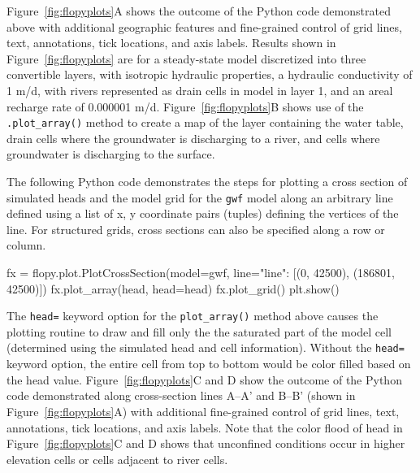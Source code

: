 \documentclass[12pt, oneside]{article}  	%
\begin{document}
\noindent Figure~\ref{fig:flopyplots}A shows the outcome of the Python code demonstrated above with additional geographic features and fine-grained control of grid lines, text, annotations, tick locations, and axis labels. Results shown in Figure~\ref{fig:flopyplots} are for a steady-state model discretized into three convertible layers, with isotropic hydraulic properties, a hydraulic conductivity of 1 m/d, with rivers represented as drain cells in model in layer 1, and an areal recharge rate of 0.000001 m/d. Figure~\ref{fig:flopyplots}B shows use of the \texttt{.plot\_array()} method to create a map of the layer containing the water table, drain cells where the groundwater is discharging to a river, and cells where groundwater is discharging to the surface.

The following Python code demonstrates the steps for plotting a cross section of simulated heads and the model grid for the \texttt{gwf} model along an arbitrary line defined using a list of x, y coordinate pairs (tuples) defining the vertices of the line. For structured grids, cross sections can also be specified along a row or column.

\begin{python}
fx = flopy.plot.PlotCrossSection(model=gwf, 
                                 line={"line": [(0, 42500), (186801, 42500)]})
fx.plot_array(head, head=head)
fx.plot_grid()
plt.show()
\end{python}

\noindent The \texttt{head=} keyword option for the \texttt{plot\_array()} method above causes the plotting routine to draw and fill only the the saturated part of the model cell (determined using the simulated head and cell information). Without the \texttt{head=} keyword option, the entire cell from top to bottom would be color filled based on the head value. Figure~\ref{fig:flopyplots}C and D show the outcome of the Python code demonstrated along cross-section lines A--A' and B--B' (shown in Figure~\ref{fig:flopyplots}A) with additional fine-grained control of grid lines, text, annotations, tick locations, and axis labels. Note that the color flood of head in Figure~\ref{fig:flopyplots}C and D shows that unconfined conditions occur in higher elevation cells or cells adjacent to river cells.
\end{document}
